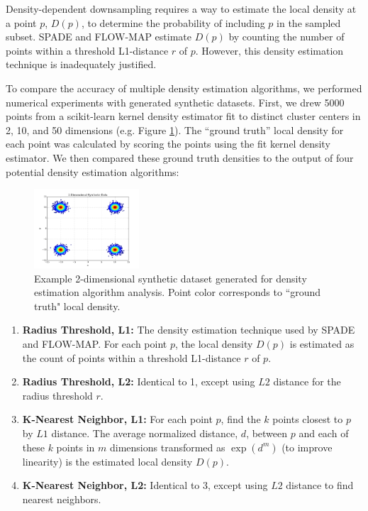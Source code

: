 \documentclass{article}
\begin{document}
Density-dependent downsampling requires a way to estimate the local density at a point $p$, $D(p)$, to determine the probability of including $p$ in the sampled subset. 
 SPADE and FLOW-MAP estimate $D(p)$ by counting the number of points within a threshold L1-distance $r$ of $p$. However, this density estimation technique is inadequately justified.

To compare the accuracy of multiple density estimation algorithms, we performed numerical experiments with generated synthetic datasets.
 First, we drew 5000 points from a scikit-learn kernel density estimator \cite{} fit to distinct cluster centers in 2, 10, and 50 dimensions (e.g. Figure \ref{fig:ddd_data_2d}).
 The “ground truth” local density for each point was calculated by scoring the points using the fit kernel density estimator. 
 We then compared these ground truth densities to the output of four potential density estimation algorithms:

\begin{figure}
\begin{center}
\includegraphics[width=0.35\textwidth]{Figures/ddd_data_2d.png}
\end{center}
\caption{Example 2-dimensional synthetic dataset generated for density estimation algorithm analysis. 
 Point color corresponds to ``ground truth" local density.}
\label{fig:ddd_data_2d}
\end{figure}

\begin{enumerate}
\item \textbf{Radius Threshold, L1:} The density estimation technique used by SPADE and FLOW-MAP. For each point $p$, the local density $D(p)$ is estimated as the count of points within a threshold L1-distance $r$ of $p$. 

\item \textbf{Radius Threshold, L2:} Identical to 1, except using $L2$ distance for the radius threshold $r$. 

\item \textbf{K-Nearest Neighbor, L1:} For each point $p$, find the $k$ points closest to $p$ by $L1$ distance.  The average normalized distance, $d$, between $p$ and each of these $k$ points in $m$ dimensions transformed as $\exp(d^m)$ (to improve linearity) is the estimated local density $D(p)$. 

\item \textbf{K-Nearest Neighbor, L2:} Identical to 3, except using $L2$ distance to find nearest neighbors.


\end{enumerate}
\end{document}
